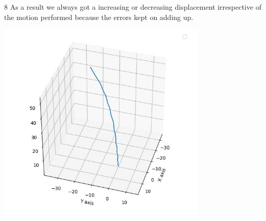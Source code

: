 8
As a result we always got a increasing or decreasing displacement
irrespective of the motion performed because the errors kept on adding
up.

\includegraphics[width=10cm]{plot.png}
